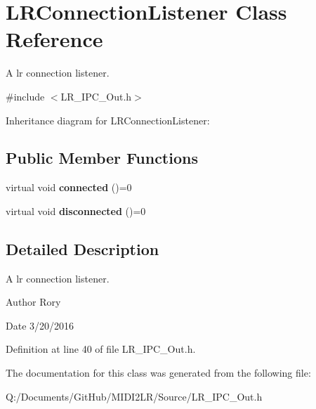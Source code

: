 \hypertarget{class_l_r_connection_listener}{}\section{L\+R\+Connection\+Listener Class Reference}
\label{class_l_r_connection_listener}


A lr connection listener.  




{\ttfamily \#include $<$L\+R\+\_\+\+I\+P\+C\+\_\+\+Out.\+h$>$}



Inheritance diagram for L\+R\+Connection\+Listener\+:
\subsection*{Public Member Functions}
\begin{DoxyCompactItemize}
\item 
virtual void {\bfseries connected} ()=0\hypertarget{class_l_r_connection_listener_a751cf0a273f7bdd3c9d1c56ca495dfe0}{}\label{class_l_r_connection_listener_a751cf0a273f7bdd3c9d1c56ca495dfe0}

\item 
virtual void {\bfseries disconnected} ()=0\hypertarget{class_l_r_connection_listener_a77600d9569cff2499b049687b3c1ac8f}{}\label{class_l_r_connection_listener_a77600d9569cff2499b049687b3c1ac8f}

\end{DoxyCompactItemize}


\subsection{Detailed Description}
A lr connection listener. 

\begin{DoxyAuthor}{Author}
Rory 
\end{DoxyAuthor}
\begin{DoxyDate}{Date}
3/20/2016 
\end{DoxyDate}


Definition at line 40 of file L\+R\+\_\+\+I\+P\+C\+\_\+\+Out.\+h.



The documentation for this class was generated from the following file\+:\begin{DoxyCompactItemize}
\item 
Q\+:/\+Documents/\+Git\+Hub/\+M\+I\+D\+I2\+L\+R/\+Source/L\+R\+\_\+\+I\+P\+C\+\_\+\+Out.\+h\end{DoxyCompactItemize}
